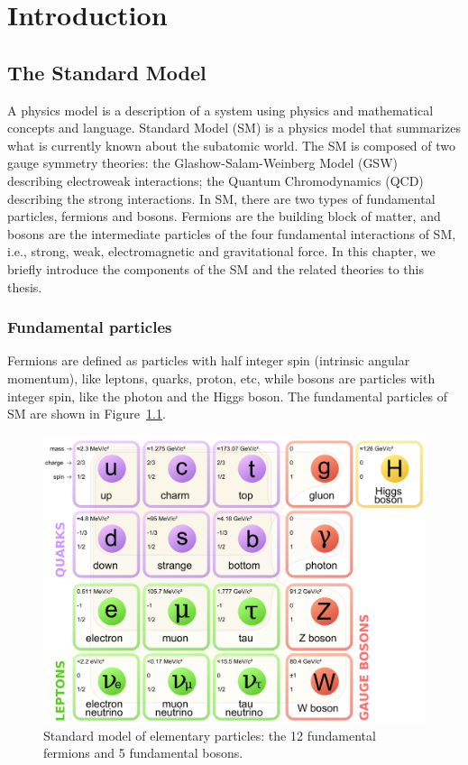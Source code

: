 \chapter{Introduction}
\label{label:chapIntro}

\section{The Standard Model}
A physics model is a description of a system using physics and mathematical concepts and language.
Standard Model (SM) is a physics model that summarizes what is currently known about the subatomic world. The SM is composed of two gauge symmetry theories: the Glashow-Salam-Weinberg Model (GSW)~\cite{Glashow, Salam, Weinberg} describing electroweak interactions; the Quantum Chromodynamics 
(QCD)~\cite{QCD} describing the strong interactions. 
In SM, there are 
two types of fundamental particles, fermions and bosons. Fermions are the building block of matter,
and bosons are the intermediate particles of the four fundamental interactions of SM, i.e., strong, weak, electromagnetic and
gravitational force. 
In this chapter, we briefly introduce the components of the SM and the related theories to this thesis. 


\subsection{Fundamental particles}

Fermions are defined as particles with half integer spin (intrinsic angular momentum), like leptons, quarks, proton, etc, while bosons are particles with integer spin, like the photon and the Higgs boson.
The fundamental particles of SM are shown in Figure~\ref{fig:SMParticles}. 

\begin{figure}[!htbp]
\centering
\includegraphics[width=.7\textwidth]{figures/Standard_Model_particles.png}
\caption{Standard model of elementary particles: 
the 12 fundamental fermions and 5 fundamental bosons.~\cite{particleImage}}
\label{fig:SMParticles}
\end{figure}  


